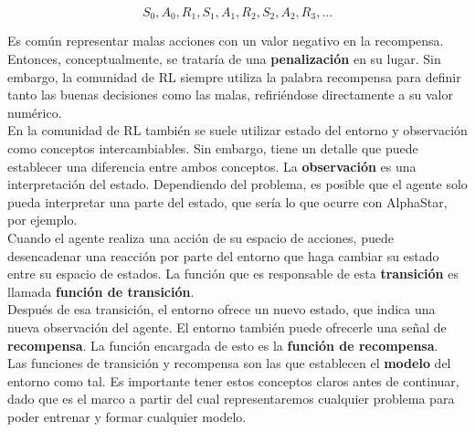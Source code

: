 \documentclass[11pt,fleqn]{book} %
\begin{document}
\begin{equation*}
S_0, A_0, R_1, S_1, A_1, R_2, S_2, A_2, R_3, ...
\end{equation*}

Es común representar malas acciones con un valor negativo en la recompensa. Entonces, conceptualmente, se trataría de una \textbf{penalización} en su lugar. Sin embargo, la comunidad de RL siempre utiliza la palabra recompensa para definir tanto las buenas decisiones como las malas, refiriéndose directamente a su valor numérico. \\

En la comunidad de RL también se suele utilizar estado del entorno y observación como conceptos intercambiables. Sin embargo, tiene un detalle que puede establecer una diferencia entre ambos conceptos. La \textbf{observación} es una interpretación del estado. Dependiendo del problema, es posible que el agente solo pueda interpretar una parte del estado, que sería lo que ocurre con AlphaStar, por ejemplo. \\

Cuando el agente realiza una acción de su espacio de acciones, puede desencadenar una reacción por parte del entorno que haga cambiar su estado entre su espacio de estados. La función que es responsable de esta \textbf{transición} es llamada \textbf{función de transición}. \\

Después de esa transición, el entorno ofrece un nuevo estado, que indica una nueva observación del agente. El entorno también puede ofrecerle una señal de \textbf{recompensa}. La función encargada de esto es la \textbf{función de recompensa}. \\

Las funciones de transición y recompensa son las que establecen el \textbf{modelo} del entorno como tal. Es importante tener estos conceptos claros antes de continuar, dado que es el marco a partir del cual representaremos cualquier problema para poder entrenar y formar cualquier modelo. \\

\end{document}
